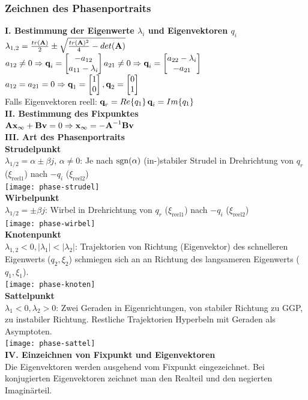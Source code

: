 \documentclass[fs, footer]{latex4ei}
\begin{document}
\begin{multicols*}{4}
    \subsubsection{Zeichnen des Phasenportraits}
    \textbf{I. Bestimmung der Eigenwerte $\lambda_i$ und Eigenvektoren $q_i$}\\
    $\lambda_{1,2} = \frac{tr(\textbf{A})}{2} \pm \sqrt{\frac{tr(\textbf{A})^2}{4}-det(\textbf{A})}$\\
    $a_{12} \neq 0 \Rightarrow \textbf{q}_i = \begin{bmatrix} -a_{12}\\a_{11}-\lambda_i \end{bmatrix}$\quad $a_{21} \neq 0 \Rightarrow \textbf{q}_i = \begin{bmatrix} a_{22}-\lambda_i\\-a_{21} \end{bmatrix}$\quad$a_{12} = a_{21} = 0 \Rightarrow \textbf{q}_1 = \begin{bmatrix} 1\\0 \end{bmatrix}, \textbf{q}_2 = \begin{bmatrix} 0\\1 \end{bmatrix}$\\
    Falls Eigenvektoren reell: $\textbf{q}_r = Re\{q_1\}$\qquad$\textbf{q}_i = Im\{q_1\}$\\
    \textbf{II. Bestimmung des Fixpunktes}\\
    $\textbf{A}\textbf{x}_\infty + \textbf{B}\textbf{v} = 0 \Rightarrow \textbf{x}_\infty = -\textbf{A}^{-1} \textbf{B}\textbf{v}$\\
    \textbf{III. Art des Phasenportraits}\\
    \textbf{Strudelpunkt}\\
    $\lambda_{1/2} = \alpha \pm \beta j$, $\alpha \neq 0$: Je nach $\operatorname{sgn}(\alpha)$ (in-)stabiler Strudel in Drehrichtung von $q_r$ ($\xi_{\text{reel}1}$) nach $-q_i$ ($\xi_{\text{reel}2}$)\\
    \texttt{[image: phase-strudel]}\\
    \textbf{Wirbelpunkt}\\
    $\lambda_{1/2} = \pm \beta j$: Wirbel in Drehrichtung von $q_r$ ($\xi_{\text{reel}1}$) nach $-q_i$ ($\xi_{\text{reel}2}$)\\
    \texttt{[image: phase-wirbel]}\\
    \textbf{Knotenpunkt}\\
    $\lambda_{1,2} < 0, |\lambda_1| < |\lambda_2|$: Trajektorien von Richtung (Eigenvektor) des schnelleren Eigenwerts ($q_2, \xi_2$) schmiegen sich an an Richtung des langsameren Eigenwerts ($q_1, \xi_1$).\\
    \texttt{[image: phase-knoten]}\\
    \textbf{Sattelpunkt}\\
    $\lambda_1 < 0, \lambda_2 > 0$: Zwei Geraden in Eigenrichtungen, von stabiler Richtung zu GGP, zu instabiler Richtung. Restliche Trajektorien Hyperbeln mit Geraden als Asymptoten.\\
    \texttt{[image: phase-sattel]}\\
    \textbf{IV. Einzeichnen von Fixpunkt und Eigenvektoren}\\
    Die Eigenvektoren werden ausgehend vom Fixpunkt eingezeichnet. Bei konjugierten Eigenvektoren zeichnet man den Realteil und den negierten Imaginärteil.\\

\end{multicols*}
\end{document}
